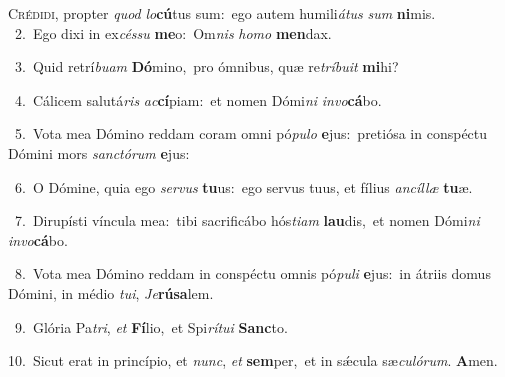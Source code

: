 \lettrine{\initial\textcolor{\initialcolor}{C}}{rédidi,} propter \textit{quod} \textit{lo}\-\textbf{cú}tus sum:~\star ego autem humili\-\textit{á}\-\textit{tus} \textit{sum} \textbf{ni}\-mis.\\
{\numbfont\textcolor{\numbcolor}{~2.}}~Ego dixi in ex\-\textit{cés}\-\textit{su} \textbf{me}\-o:~\star Om\textit{nis} \textit{ho}\-\textit{mo} \textbf{men}\-dax.\par
{\numbfont\textcolor{\numbcolor}{~3.}}~Quid retrí\-\textit{bu}\-\textit{am} \textbf{Dó}\-mino,~\star pro ómnibus, quæ re\-\textit{trí}\-\textit{bu}\textit{it} \textbf{mi}\-hi?\par
{\numbfont\textcolor{\numbcolor}{~4.}}~Cálicem salutá\textit{ris} \textit{ac}\-\textbf{cí}piam:~\star et nomen Dómi\textit{ni} \textit{in}\-\textit{vo}\textbf{cá}bo.\par
{\numbfont\textcolor{\numbcolor}{~5.}}~Vota mea Dómino reddam coram omni pó\-\textit{pu}\-\textit{lo} \textbf{e}\-jus:~\star pretiósa in conspéctu Dómini mors \textit{sanc}\-\textit{tó}\textit{rum} \textbf{e}\-jus:\par
{\numbfont\textcolor{\numbcolor}{~6.}}~O Dómine, quia ego \textit{ser}\-\textit{vus} \textbf{tu}\-us:~\star ego servus tuus, et fílius \textit{an}\-\textit{cíl}\textit{læ} \textbf{tu}\-æ.\par
{\numbfont\textcolor{\numbcolor}{~7.}}~Dirupísti víncula mea:~\dagger tibi sacrificábo hós\-\textit{ti}\-\textit{am} \textbf{lau}\-dis,~\star et nomen Dómi\textit{ni} \textit{in}\-\textit{vo}\textbf{cá}bo.\par
{\numbfont\textcolor{\numbcolor}{~8.}}~Vota mea Dómino reddam in conspéctu omnis pó\-\textit{pu}\-\textit{li} \textbf{e}\-jus:~\star in átriis domus Dómini, in médio \textit{tu}\-\textit{i}, \textit{Je}\-\textbf{rú}\textbf{sa}lem.\par
{\numbfont\textcolor{\numbcolor}{~9.}}~Glória Pa\-\textit{tri}\-, \textit{et} \textbf{Fí}\-lio,~\star et Spi\-\textit{rí}\-\textit{tu}\textit{i} \textbf{Sanc}\-to.\par
{\numbfont\textcolor{\numbcolor}{10.}}~Sicut erat in princípio, et \textit{nunc}\-, \textit{et} \textbf{sem}\-per,~\star et in sǽcula sæ\-\textit{cu}\-\textit{ló}\textit{rum}. \textbf{A}\-men.\par
